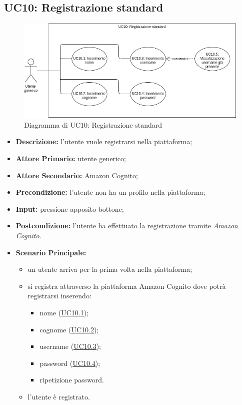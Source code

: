 \subsection{UC10: Registrazione standard}
\label{sec:UC10}
\begin{figure}[!ht]
    \caption{Diagramma di UC10: Registrazione standard}
    \vspace{10px}
    \includegraphics[scale=0.5]{../../../Images/AnalisiRequisiti/UC10}
    \centering
\end{figure}
\begin{itemize}
    \item \textbf{Descrizione:} l'utente vuole registrarsi nella piattaforma;
    \item \textbf{Attore Primario:} utente generico;
    \item \textbf{Attore Secondario:} Amazon Cognito;
    \item \textbf{Precondizione:} l'utente non ha un profilo nella piattaforma;
    \item \textbf{Input:} pressione apposito bottone;
    \item \textbf{Postcondizione:} l'utente ha effettuato la registrazione tramite \textit{Amazon Cognito}. 
    \item \textbf{Scenario Principale:}
    \begin{itemize}
        \item un utente arriva per la prima volta nella piattaforma;
        \item si registra attraverso la piattaforma Amazon Cognito dove potrà registrarsi inserendo:
        \begin{itemize}
            \item nome (\hyperref[sec:UC10.1]{\underline{UC10.1}});
            \item cognome (\hyperref[sec:UC10.2]{\underline{UC10.2}});
            \item username (\hyperref[sec:UC10.3]{\underline{UC10.3}});
            \item password (\hyperref[sec:UC10.4]{\underline{UC10.4}});
            \item ripetizione password.
        \end{itemize}
        \item l'utente è registrato.
    \end{itemize} 
\end{itemize}

